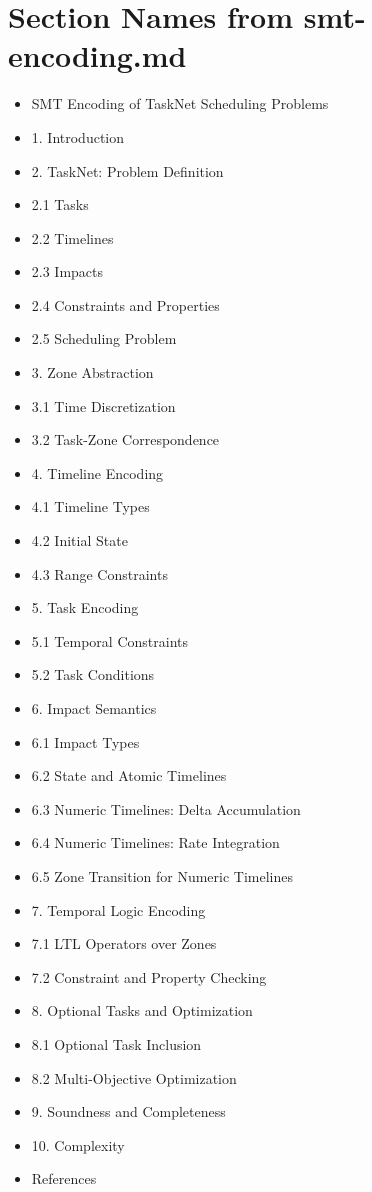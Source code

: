 \documentclass{article}
\begin{document}
\section*{Section Names from smt-encoding.md}

\begin{itemize}
\item SMT Encoding of TaskNet Scheduling Problems
\item 1. Introduction
\item 2. TaskNet: Problem Definition
\item 2.1 Tasks
\item 2.2 Timelines
\item 2.3 Impacts
\item 2.4 Constraints and Properties
\item 2.5 Scheduling Problem
\item 3. Zone Abstraction
\item 3.1 Time Discretization
\item 3.2 Task-Zone Correspondence
\item 4. Timeline Encoding
\item 4.1 Timeline Types
\item 4.2 Initial State
\item 4.3 Range Constraints
\item 5. Task Encoding
\item 5.1 Temporal Constraints
\item 5.2 Task Conditions
\item 6. Impact Semantics
\item 6.1 Impact Types
\item 6.2 State and Atomic Timelines
\item 6.3 Numeric Timelines: Delta Accumulation
\item 6.4 Numeric Timelines: Rate Integration
\item 6.5 Zone Transition for Numeric Timelines
\item 7. Temporal Logic Encoding
\item 7.1 LTL Operators over Zones
\item 7.2 Constraint and Property Checking
\item 8. Optional Tasks and Optimization
\item 8.1 Optional Task Inclusion
\item 8.2 Multi-Objective Optimization
\item 9. Soundness and Completeness
\item 10. Complexity
\item References
\end{itemize}
\end{document}
